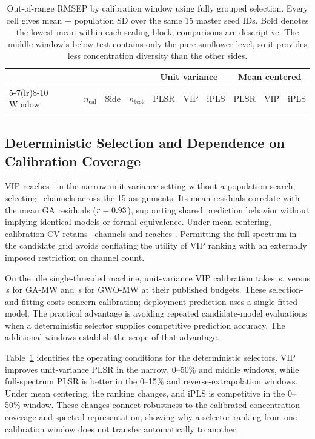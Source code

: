 \begin{table}[!t]
\caption{Out-of-range RMSEP by calibration window using fully grouped selection. Every cell gives mean $\pm$ population SD over the same 15 master seed IDs. Bold denotes the lowest mean within each scaling block; comparisons are descriptive. The middle window's below test contains only the pure-sunflower level, so it provides less concentration diversity than the other sides.}
\label{tab:windows}
\centering\footnotesize
\setlength{\tabcolsep}{5pt}
\begin{tabular}{@{}lrlrcccccc@{}}
\toprule
 & & & & \multicolumn{3}{c}{Unit variance} & \multicolumn{3}{c}{Mean centered}\\
\cmidrule(lr){5-7}\cmidrule(lr){8-10}
Window & $n_{\mathrm{cal}}$ & Side & $n_{\mathrm{test}}$ & PLSR & VIP & iPLS & PLSR & VIP & iPLS\\
\midrule
\\
\bottomrule
\end{tabular}
\end{table}

\subsection{Deterministic Selection and Dependence on Calibration Coverage}
VIP reaches \UnitVIP\ in the narrow unit-variance setting without a population search, selecting \UnitVIPK\ channels across the 15 assignments. Its mean residuals correlate with the mean GA residuals ($r=0.93$), supporting shared prediction behavior without implying identical models or formal equivalence. Under mean centering, calibration CV retains \MeanVIPK\ channels and reaches \MeanVIP. Permitting the full spectrum in the candidate grid avoids conflating the utility of VIP ranking with an externally imposed restriction on channel count.

On the idle single-threaded machine, unit-variance VIP calibration takes \UnitVIPTime\,s, versus \UnitGATime\,s for GA-MW and \UnitGWOTime\,s for GWO-MW at their published budgets. These selection-and-fitting costs concern calibration; deployment prediction uses a single fitted model. The practical advantage is avoiding repeated candidate-model evaluations when a deterministic selector supplies competitive prediction accuracy. The additional windows establish the scope of that advantage.

Table~\ref{tab:windows} identifies the operating conditions for the deterministic selectors. VIP improves unit-variance PLSR in the narrow, 0--50\% and middle windows, while full-spectrum PLSR is better in the 0--15\% and reverse-extrapolation windows. Under mean centering, the ranking changes, and iPLS is competitive in the 0--50\% window. These changes connect robustness to the calibrated concentration coverage and spectral representation, showing why a selector ranking from one calibration window does not transfer automatically to another.

